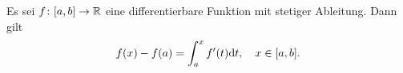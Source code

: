 Es sei $f\colon [a,b]\to \mathbb{R}$ eine differentierbare Funktion mit stetiger Ableitung. Dann gilt\pause
\begin{equation*}
    f(x)-f(a) = \int_a^x f'(t)\mathrm{d} t,\quad x\in[a,b].
\end{equation*}